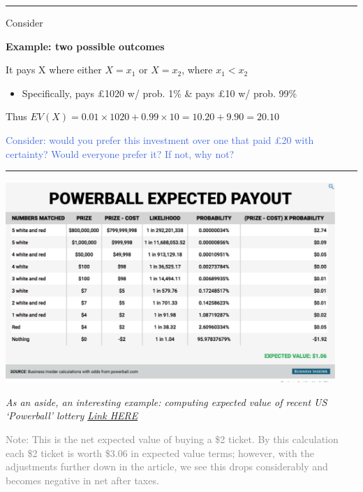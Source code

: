 \documentclass[]{article}
\providecommand{\tightlist}{%
  \setlength{\itemsep}{0pt}\setlength{\parskip}{0pt}}
\begin{document}
\begin{center}\rule{0.5\linewidth}{\linethickness}\end{center}

Consider

\textbf{Example: two possible outcomes}

It pays X where either \(X =x_1\) or \(X=x_2\), where \(x_1< x_2\)

\begin{itemize}
\tightlist
\item
  Specifically, pays \pounds1020 w/ prob. 1\% \& pays \pounds10 w/ prob.
  99\%
\end{itemize}

Thus
\(EV(X) = 0.01 \times 1020 + 0.99 \times 10 = 10.20 + 9.90 = 20.10\)

\textcolor{RoyalBlue}{Consider: would you prefer this investment over one that paid £20 with certainty? Would everyone prefer it? If not, why not?}

\begin{center}\rule{0.5\linewidth}{\linethickness}\end{center}

\includegraphics[height=3in]{picsfigs/powerball.png}

\emph{As an aside, an interesting example: computing expected value of
recent US `Powerball' lottery
\href{http://uk.businessinsider.com/powerball-lottery-expected-value-jan-9-draw-2016-1?r=US\&IR=T}{Link
HERE}}

\textcolor{gray}{Note: This is the net expected value of buying a \$2 ticket. By this calculation each \$2 ticket is worth \$3.06 in expected value terms; however, with the adjustments further down in the article, we see this drops considerably and becomes negative in net after taxes.}
\end{document}
